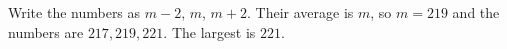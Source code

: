 Write the numbers as $m-2$, $m$, $m+2$. Their average is $m$, so $m=219$ and the numbers are $217,219,221$. The largest is $\boxed{221}$.
